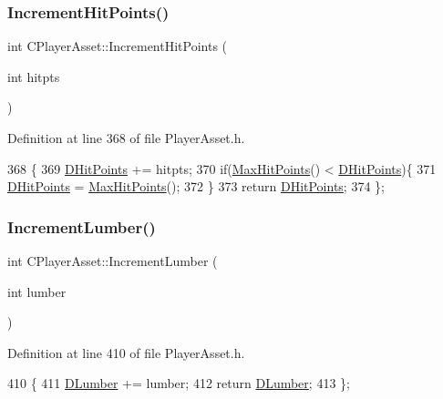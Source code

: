 \subsubsection{\texorpdfstring{Increment\+Hit\+Points()}{IncrementHitPoints()}}
{\footnotesize\ttfamily int C\+Player\+Asset\+::\+Increment\+Hit\+Points (\begin{DoxyParamCaption}\item[{int}]{hitpts }\end{DoxyParamCaption})\hspace{0.3cm}{\ttfamily [inline]}}



Definition at line 368 of file Player\+Asset.\+h.


\begin{DoxyCode}
368                                           \{
369             \hyperlink{classCPlayerAsset_a331750935bf594e665544085fb74e89d}{DHitPoints} += hitpts;
370             \textcolor{keywordflow}{if}(\hyperlink{classCPlayerAsset_a119a30dbc2a8e4369b9525aca812618c}{MaxHitPoints}() < \hyperlink{classCPlayerAsset_a331750935bf594e665544085fb74e89d}{DHitPoints})\{
371                 \hyperlink{classCPlayerAsset_a331750935bf594e665544085fb74e89d}{DHitPoints} = \hyperlink{classCPlayerAsset_a119a30dbc2a8e4369b9525aca812618c}{MaxHitPoints}();   
372             \}
373             \textcolor{keywordflow}{return} \hyperlink{classCPlayerAsset_a331750935bf594e665544085fb74e89d}{DHitPoints};
374         \};
\end{DoxyCode}
\hypertarget{classCPlayerAsset_a12855b5c0cddb6b72e5ecba92ae77223}{}\label{classCPlayerAsset_a12855b5c0cddb6b72e5ecba92ae77223} 
\subsubsection{\texorpdfstring{Increment\+Lumber()}{IncrementLumber()}}
{\footnotesize\ttfamily int C\+Player\+Asset\+::\+Increment\+Lumber (\begin{DoxyParamCaption}\item[{int}]{lumber }\end{DoxyParamCaption})\hspace{0.3cm}{\ttfamily [inline]}}



Definition at line 410 of file Player\+Asset.\+h.


\begin{DoxyCode}
410                                        \{
411             \hyperlink{classCPlayerAsset_af726ea7df9596f02cdb1428d61186349}{DLumber} += lumber;
412             \textcolor{keywordflow}{return} \hyperlink{classCPlayerAsset_af726ea7df9596f02cdb1428d61186349}{DLumber};
413         \};
\end{DoxyCode}
\hypertarget{classCPlayerAsset_aa1d39b408fd5aa11f2c3a19ef4d3895d}{}\label{classCPlayerAsset_aa1d39b408fd5aa11f2c3a19ef4d3895d} 
